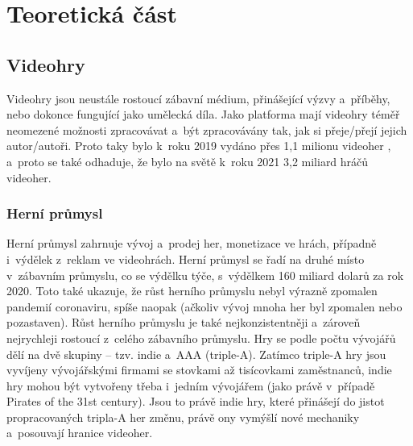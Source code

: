 \documentclass[a4paper]{extarticle}
\begin{document}
\setcounter{page}{3}
\setcounter{section}{1}
\section{Teoretická část}
\subsection{Videohry}
Videohry jsou neustále rostoucí zábavní médium, přinášející výzvy a~příběhy, nebo dokonce fungující jako umělecká díla. Jako platforma mají videohry téměř neomezené možnosti zpracovávat a~být zpracovávány tak, jak si přeje/přejí jejich autor/autoři. Proto taky bylo k~roku 2019 vydáno přes 1,1 milionu videoher \cite{games_number}, a~proto se také odhaduje, že bylo na světě k~roku 2021 3,2 miliard hráčů videoher. \cite{gamers}
\subsubsection{Herní průmysl}
Herní průmysl zahrnuje vývoj a~prodej her, monetizace ve hrách, případně i~výdělek z~reklam ve videohrách.
Herní průmysl se řadí na druhé místo v~zábavním průmyslu, co se výdělku týče, s~výdělkem 160 miliard dolarů za rok 2020. \cite{media_revenue} Toto také ukazuje, že růst herního průmyslu nebyl výrazně zpomalen pandemií coronaviru, spíše naopak (ačkoliv vývoj mnoha her byl zpomalen nebo pozastaven). Růst herního průmyslu je také nejkonzistentněji a~zároveň nejrychleji rostoucí z~celého zábavního průmyslu.
Hry se podle počtu vývojářů dělí na dvě skupiny – tzv. indie a~AAA (triple-A). Zatímco triple-A hry jsou vyvíjeny vývojářskými firmami se stovkami až tisícovkami zaměstnanců, indie hry mohou být vytvořeny třeba i~jedním vývojářem (jako právě v~případě Pirates of the 31st century). Jsou to právě indie hry, které přinášejí do jistot propracovaných tripla-A her změnu, právě ony vymýšlí nové mechaniky a~posouvají hranice videoher.
\end{document}
